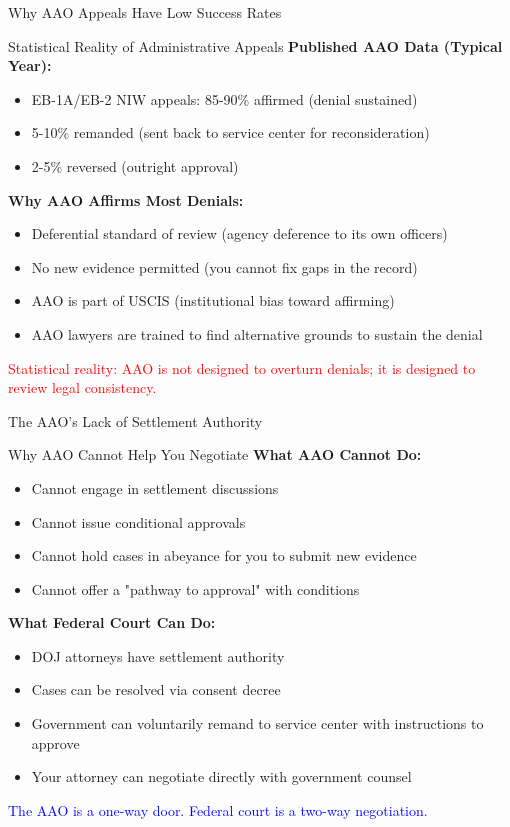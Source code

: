 \documentclass[11pt]{beamer}
\begin{document}
	
	\begin{frame}{Why AAO Appeals Have Low Success Rates}
		\scriptsize
		\begin{block}{Statistical Reality of Administrative Appeals}
			\textbf{Published AAO Data (Typical Year):}
			\begin{itemize}
				\item EB-1A/EB-2 NIW appeals: 85-90\% affirmed (denial sustained)
				\item 5-10\% remanded (sent back to service center for reconsideration)
				\item 2-5\% reversed (outright approval)
			\end{itemize}
			\textbf{Why AAO Affirms Most Denials:}
			\begin{itemize}
				\item Deferential standard of review (agency deference to its own officers)
				\item No new evidence permitted (you cannot fix gaps in the record)
				\item AAO is part of USCIS (institutional bias toward affirming)
				\item AAO lawyers are trained to find alternative grounds to sustain the denial
			\end{itemize}
			\textcolor{red}{Statistical reality: AAO is not designed to overturn denials; it is designed to review legal consistency.}
		\end{block}
	\end{frame}
	
	\begin{frame}{The AAO's Lack of Settlement Authority}
		\scriptsize
		\begin{block}{Why AAO Cannot Help You Negotiate}
			\textbf{What AAO Cannot Do:}
			\begin{itemize}
				\item Cannot engage in settlement discussions
				\item Cannot issue conditional approvals
				\item Cannot hold cases in abeyance for you to submit new evidence
				\item Cannot offer a "pathway to approval" with conditions
			\end{itemize}
			\textbf{What Federal Court Can Do:}
			\begin{itemize}
				\item DOJ attorneys have settlement authority
				\item Cases can be resolved via consent decree
				\item Government can voluntarily remand to service center with instructions to approve
				\item Your attorney can negotiate directly with government counsel
			\end{itemize}
			\textcolor{blue}{The AAO is a one-way door. Federal court is a two-way negotiation.}
		\end{block}
	\end{frame}
	
\end{document}
